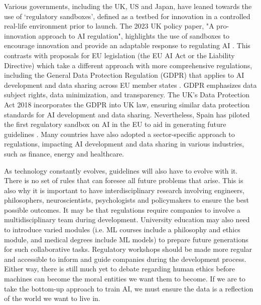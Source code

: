 \documentclass[10pt]{article}
\begin{document}
Various governments, including the UK, US and Japan, have leaned towards the use of ‘regulatory sandboxes’, defined as a testbed for innovation in a controlled real-life environment prior to launch. The 2023 UK policy paper, "A pro-innovation approach to AI regulation", highlights the use of sandboxes to encourage innovation and provide an adaptable response to regulating AI \textsuperscript{\cite{department_for_pro-innovation_2023}}. This contrasts with proposals for EU legislation (the EU AI Act or the Liability Directive) which take a different approach with more comprehensive regulations, including the General Data Protection Regulation (GDPR) that applies to AI development and data sharing across EU member states \textsuperscript{\cite{european_commission_launch_2022}}. GDPR emphasizes data subject rights, data minimization, and transparency. The UK's Data Protection Act 2018 incorporates the GDPR into UK law, ensuring similar data protection standards for AI development and data sharing. Nevertheless, Spain has piloted the first regulatory sandbox on AI in the EU to aid in generating future guidelines \textsuperscript{\cite{european_commission_launch_2022}}. Many countries have also adopted a sector-specific approach to regulations, impacting AI development and data sharing in various industries, such as finance, energy and healthcare.

As technology constantly evolves, guidelines will also have to evolve with it. There is no set of rules that can foresee all future problems that arise. This is also why it is important to have interdisciplinary research involving engineers, philosophers, neuroscientists, psychologists and policymakers to ensure the best possible outcomes. It may be that regulations require companies to involve a multidisciplinary team during development. University education may also need to introduce varied modules (i.e. ML courses include a philosophy and ethics module, and medical degrees include ML models) to prepare future generations for such collaborative tasks. Regulatory workshops should be made more regular and accessible to inform and guide companies during the development process.
Either way, there is still much yet to debate regarding human ethics before machines can become the moral entities we want them to become. If we are to take the bottom-up approach to train AI, we must ensure the data is a reflection of the world we want to live in.
\end{document}
